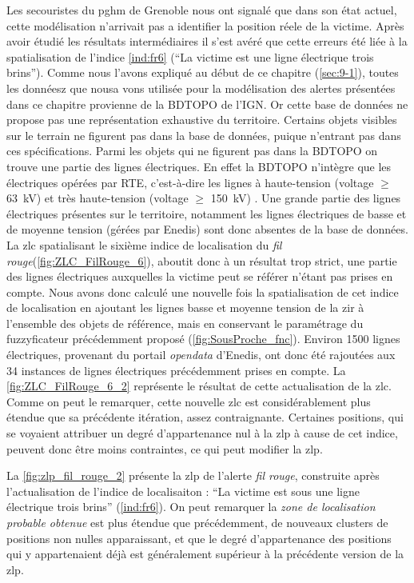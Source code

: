 Les secouristes du \ac{pghm} de Grenoble nous ont signalé que dans son
état actuel, cette modélisation n'arrivait pas a identifier la
position réele de la victime. Après avoir étudié les résultats
intermédiaires il s'est avéré que cette erreurs été liée à la
spatialisation de l'indice \ref{ind:fr6} (\enquote{La victime est
   une ligne électrique trois
  brins}). Comme nous l'avons expliqué au début de ce chapitre
(\autoref{sec:9-1}), toutes les donnéesz que nousa vons utilisée pour
la modélisation des alertes présentées dans ce chapitre provienne de
la BDTOPO de l'IGN. Or cette base de données ne propose pas une
représentation exhaustive du territoire. Certains objets visibles sur
le terrain ne figurent pas dans la base de données, puique n'entrant
pas dans ces spécifications. Parmi les objets qui ne figurent pas dans
la BDTOPO on trouve une partie des lignes électriques. En effet la
BDTOPO n'intègre que les électriques opérées par RTE, c'est-à-dire les
lignes à haute-tension (voltage $≥$ \SI{63}{\kilo\volt}) et très
haute-tension (voltage $≥$ \SI{150}{\kilo\volt})
\autocite{IGN2020}. Une grande partie des lignes électriques présentes
sur le territoire, notamment les lignes électriques de basse et de
moyenne tension (gérées par Enedis) sont donc absentes de la base de
données.
%
La \ac{zlc} spatialisant le sixième indice de localisation du
\emph{fil rouge}(\autoref{fig:ZLC_FilRouge_6}), aboutit donc à un
résultat trop strict, une partie des lignes électriques auxquelles la
victime peut se référer n'étant pas prises en compte. Nous avons donc
calculé une nouvelle fois la spatialisation de cet indice de
localisation en ajoutant les lignes basse et moyenne tension de la
\ac{zir} à l'ensemble des objets de référence, mais en conservant le
paramétrage du fuzzyficateur précédemment proposé
(\autoref{fig:SousProche_fnc}). Environ \num{1500} lignes électriques,
provenant du portail \emph{opendata} d'Enedis, ont donc été rajoutées
aux \num{34} instances de lignes électriques précédemment prises en
compte. La \autoref{fig:ZLC_FilRouge_6_2} représente le résultat de
cette actualisation de la \ac{zlc}. Comme on peut le remarquer, cette
nouvelle \ac{zlc} est considérablement plus étendue que sa précédente
itération, assez contraignante. Certaines positions, qui se voyaient
attribuer un degré d'appartenance nul à la \ac{zlp} à cause de cet
indice, peuvent donc être moins contraintes, ce qui peut modifier la
\ac{zlp}.

La \autoref{fig:zlp_fil_rouge_2} présente la \ac{zlp} de l'alerte
\emph{fil rouge}, construite après l'actualisation de l'indice de
localisaiton : \enquote{La victime est sous une ligne électrique trois
  brins} (\ref{ind:fr6}). On peut remarquer la \emph{zone de
  localisation probable obtenue} est plus étendue que précédemment, de
nouveaux clusters de positions non nulles apparaissant, et que le
degré d'appartenance des positions qui y appartenaient déjà est
généralement supérieur à la précédente version de la \ac{zlp}.

